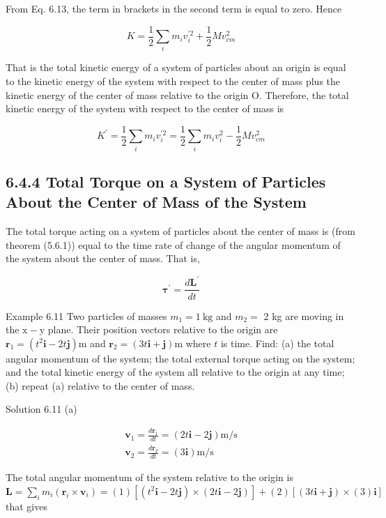 \documentclass[10pt]{article}
\begin{document}
From Eq. 6.13, the term in brackets in the second term is equal to zero. Hence

$$
K=\frac{1}{2} \sum_{i} m_{i} v_{i}^{\prime 2}+\frac{1}{2} M v_{c m}^{2}
$$

That is the total kinetic energy of a system of particles about an origin is equal to the kinetic energy of the system with respect to the center of mass plus the kinetic energy of the center of mass relative to the origin O. Therefore, the total kinetic energy of the system with respect to the center of mass is

$$
K^{\prime}=\frac{1}{2} \sum_{i} m_{i} v_{i}^{\prime 2}=\frac{1}{2} \sum_{i} m_{i} v_{i}^{2}-\frac{1}{2} M v_{c m}^{2}
$$

\subsection*{6.4.4 Total Torque on a System of Particles About the Center of Mass of the System}
The total torque acting on a system of particles about the center of mass is (from theorem (5.6.1)) equal to the time rate of change of the angular momentum of the system about the center of mass. That is,

$$
\boldsymbol{\tau}^{\prime}=\frac{d \mathbf{L}^{\prime}}{d t}
$$

Example 6.11 Two particles of masses $m_{1}=1 \mathrm{~kg}$ and $m_{2}=$ 2 kg are moving in the $\mathrm{x}-\mathrm{y}$ plane. Their position vectors relative to the origin are $\mathbf{r}_{1}=\left(t^{2} \mathbf{i}-2 t \mathbf{j}\right) \mathrm{m}$ and $\mathbf{r}_{2}=(3 t \mathbf{i}+\mathbf{j}) \mathrm{m}$ where $t$ is time. Find: (a) the total angular momentum of the system; the total external torque acting on the system; and the total kinetic energy of the system all relative to the origin at any time; (b) repeat (a) relative to the center of mass.

Solution 6.11 (a)

$$
\begin{gathered}
\mathbf{v}_{1}=\frac{d \mathbf{r}_{1}}{d t}=(2 t \mathbf{i}-2 \mathbf{j}) \mathrm{m} / \mathrm{s} \\
\mathbf{v}_{2}=\frac{d \mathbf{r}_{2}}{d t}=(3 \mathbf{i}) \mathrm{m} / \mathrm{s}
\end{gathered}
$$

The total angular momentum of the system relative to the origin is\\
$\mathbf{L}=\sum_{i} m_{i}\left(\mathbf{r}_{i} \times \mathbf{v}_{i}\right)=(1)\left[\left(t^{2} \mathbf{i}-2 t \mathbf{j}\right) \times(2 t \mathbf{i}-2 \mathbf{j})\right]+(2)[(3 t \mathbf{i}+\mathbf{j}) \times(3) \mathbf{i}]$ that gives
\end{document}
